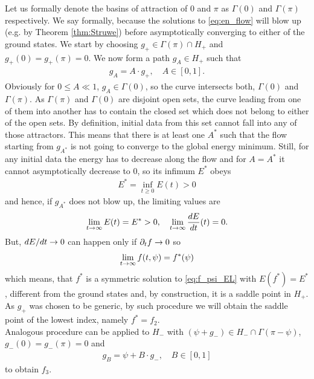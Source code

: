 Let us formally denote the basins of attraction of $0$ and $\pi$ as
$\Gamma(0)$ and $\Gamma(\pi)$ respectively. We say formally, because
the solutions to \eqref{eq:en_flow} will blow up (e.g. by Theorem
\ref{thm:Struwe}) before asymptotically converging to either of the
ground states. We start by choosing $g_+\in\Gamma(\pi)\cap H_+$ and
$g_+(0)=g_+(\pi)=0$. We now form a path $g_A\in H_+$ such that
\begin{align}
  \label{eq:93}
  g_A=A\cdot g_+,\quad A\in[0,1].
\end{align}
Obviously for $0\le A\ll1$, $g_A\in \Gamma(0)$, so the curve
intersects both, $\Gamma(0)$ and $\Gamma(\pi)$. As $\Gamma(\pi)$ and
$\Gamma(0)$ are disjoint open sets, the curve leading from one of them
into another has to contain the closed set which does not belong to
either of the open sets. By definition, initial data from this set
cannot fall into any of those attractors. This means that there is at
least one $A^*$ such that the flow starting from $g_{A^*}$ is not
going to converge to the global energy minimum. Still, for any initial
data the energy has to decrease along the flow and for $A=A^*$ it
cannot asymptotically decrease to $0$, so its infimum $E^*$ obeys
\begin{align}\label{eq:94}
  E^*=\inf_{t\ge0} E(t)>0
\end{align}
and hence, if $g_{A^*}$ does not blow up, the limiting values are
\begin{align}\label{eq:95}
  \lim_{t\rightarrow\infty}E(t)=E^*>0,\quad \lim_{t\rightarrow\infty}\frac{dE}{dt}(t)=0.
\end{align}
But, $dE/dt\rightarrow0$ can happen only if $\partial_t f\rightarrow0$ so
\begin{align}\label{eq:96}
  \lim_{t\rightarrow\infty}f(t,\psi)=f^*(\psi)
\end{align}
which means, that $f^*$ is a symmetric solution to
\eqref{eq:f_psi_EL} with $E(f^*)=E^*$, different from the ground
states and, by construction, it is a saddle point in $H_+$. As $g_+$
was chosen to be generic, by such procedure we will obtain the saddle
point of the lowest index, namely $f^*=f_2$.\\

Analogous procedure can be applied to $H_-$ with $(\psi+g_-)\in
H_-\cap\Gamma(\pi-\psi)$, $g_-(0)=g_-(\pi)=0$ and
\begin{align}
  \label{eq:97}
  g_B=\psi+B\cdot g_-,\quad B\in[0,1]
\end{align}
to obtain $f_3$.\\



